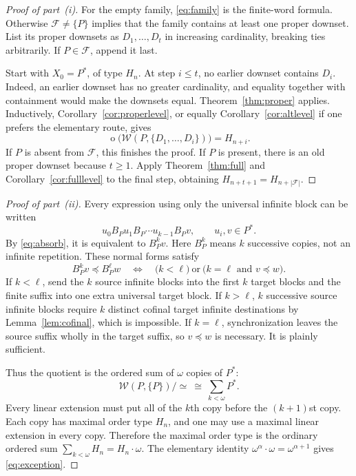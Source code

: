 \documentclass[11pt,a4paper]{article}
\numberwithin{equation}{section}
\theoremstyle{definition}
\theoremstyle{remark}
\newcommand{\mot}{\mathop{o}}
\newcommand{\W}{\mathcal W}
\newcommand{\F}{\mathcal F}
\newcommand{\emb}{\preccurlyeq}
\newcommand{\eqv}{\simeq}
\begin{document}
\begin{proof}[Proof of part~\textnormal{(i)}]
For the empty family, \eqref{eq:family} is the finite-word formula.
Otherwise $\F\ne\{P\}$ implies that the family contains at least one
proper downset. List its proper downsets as $D_1,\ldots,D_t$ in increasing
cardinality, breaking ties arbitrarily. If $P\in\F$, append it last.

Start with $X_0=P^*$, of type $H_n$. At step $i\le t$, no earlier downset
contains $D_i$. Indeed, an earlier downset has no greater cardinality, and
equality together with containment would make the downsets equal.
Theorem~\ref{thm:proper} applies. Inductively,
Corollary~\ref{cor:properlevel}, or equally
Corollary~\ref{cor:altlevel} if one prefers the elementary route, gives
\[
 \mot\bigl(\W(P,\{D_1,\ldots,D_i\})\bigr)=H_{n+i}.
\]
If $P$ is absent from $\F$, this finishes the proof. If $P$ is present,
there is an old proper downset because $t\ge1$. Apply
Theorem~\ref{thm:full} and Corollary~\ref{cor:fulllevel} to the final step,
obtaining $H_{n+t+1}=H_{n+|\F|}$.
\end{proof}

\begin{proof}[Proof of part~\textnormal{(ii)}]
Every expression using only the universal infinite block can be written
\[
 u_0B_Pu_1B_P\cdots u_{k-1}B_Pv,
 \qquad u_i,v\in P^*.
\]
By \eqref{eq:absorb}, it is equivalent to $B_P^kv$. Here $B_P^k$ means
$k$ successive copies, not an infinite repetition. These normal forms
satisfy
\begin{equation}\label{eq:univorder}
 B_P^kv\emb B_P^\ell w
 \quad\Longleftrightarrow\quad
 \bigl(k<\ell\bigr)\ \text{or}\
 \bigl(k=\ell\text{ and }v\emb w\bigr).
\end{equation}
If $k<\ell$, send the $k$ source infinite blocks into the first $k$ target
blocks and the finite suffix into one extra universal target block.
If $k>\ell$, $k$ successive source infinite blocks require $k$ distinct
cofinal target infinite destinations by Lemma~\ref{lem:cofinal}, which is
impossible. If $k=\ell$, synchronization leaves the source suffix wholly
in the target suffix, so $v\emb w$ is necessary. It is plainly sufficient.

Thus the quotient is the ordered sum of $\omega$ copies of $P^*$:
\begin{equation}\label{eq:sum}
 \W(P,\{P\})/\eqv\ \cong\ \sum_{k<\omega}P^*.
\end{equation}
Every linear extension must put all of the $k$th copy before the
$(k+1)$st copy. Each copy has maximal order type $H_n$, and one may use
a maximal linear extension in every copy. Therefore the maximal order
type is the ordinary ordered sum $\sum_{k<\omega}H_n=H_n\cdot\omega$.
The elementary identity
$\omega^\alpha\cdot\omega=\omega^{\alpha+1}$ gives
\eqref{eq:exception}.
\end{proof}
\end{document}
